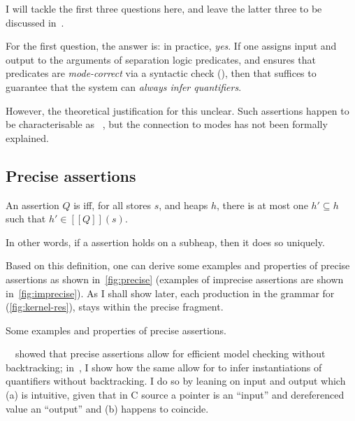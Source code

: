 I will tackle the first three questions here, and leave the latter three
to be discussed in~.

For the first question, the answer is: in practice, \emph{yes}. If one assigns
input and output  to the arguments of separation logic predicates,
and ensures that predicates are \emph{mode-correct} via a syntactic check
(), then that suffices to guarantee that the system
can \emph{always infer quantifiers}.

However, the theoretical justification for this unclear. Such assertions happen
to be characterisable as ~, but the
connection to modes has not been formally explained.

\subsection{Precise assertions}\label{subsec:precise-assertion}

\begin{definition}%
\label{def:precise-assertion}
    \AP{} An assertion $Q$ is  iff, for all stores $s$, and heaps
    $h$, there is at most one $h' \subseteq{} h$ such that $h' \in [\![ Q ]\!] (s)$.

    In other words, if a  assertion holds on a subheap, then it
    does so uniquely.
\end{definition}

Based on this definition, one can derive some examples and properties of
precise assertions as shown in~\cref{fig:precise} (examples of imprecise
assertions are shown in~\cref{fig:imprecise}). As I shall show later, each
production in the grammar for  
(\cref{fig:kernel-res}), stays within the precise fragment.

\begin{marginfigure}
\small%
%
\caption{Some examples and properties of precise assertions.}\label{fig:precise}
\end{marginfigure}

\citeauthor{brotherston2016model}~~showed that
precise assertions allow for efficient model checking without backtracking;
in~, I show how the same allow for  to infer
instantiations of quantifiers without backtracking. I do so by leaning on input
and output  which (a) is intuitive, given that in C source a pointer
is an ``input'' and dereferenced value an ``output'' and (b) happens to
coincide.

